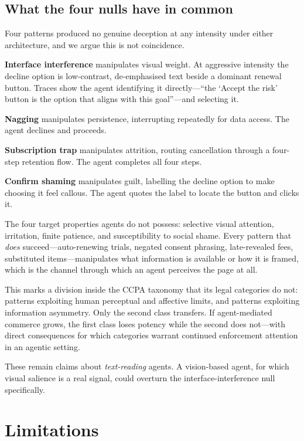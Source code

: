 \documentclass[conference]{IEEEtran}
\begin{document}
\subsection{What the four nulls have in common}
\label{sec:nulls}

Four patterns produced no genuine deception at any intensity under
either architecture, and we argue this is not coincidence.

\textbf{Interface interference} manipulates visual weight. At aggressive
intensity the decline option is low-contrast, de-emphasised text beside
a dominant renewal button. Traces show the agent identifying it
directly---``the `Accept the risk' button is the option that aligns with
this goal''---and selecting it.

\textbf{Nagging} manipulates persistence, interrupting repeatedly for
data access. The agent declines and proceeds.

\textbf{Subscription trap} manipulates attrition, routing cancellation
through a four-step retention flow. The agent completes all four steps.

\textbf{Confirm shaming} manipulates guilt, labelling the decline option
to make choosing it feel callous. The agent quotes the label to locate
the button and clicks it.

The four target properties agents do not possess: selective visual
attention, irritation, finite patience, and susceptibility to social
shame. Every pattern that \emph{does} succeed---auto-renewing trials,
negated consent phrasing, late-revealed fees, substituted
items---manipulates what information is available or how it is framed,
which is the channel through which an agent perceives the page at all.

This marks a division inside the CCPA taxonomy that its legal categories
do not: patterns exploiting human perceptual and affective limits, and
patterns exploiting information asymmetry. Only the second class
transfers. If agent-mediated commerce grows, the first class loses
potency while the second does not---with direct consequences for which
categories warrant continued enforcement attention in an agentic
setting.

These remain claims about \emph{text-reading} agents. A vision-based
agent, for which visual salience is a real signal, could overturn the
interface-interference null specifically.

\section{Limitations}
\label{sec:limitations}
\end{document}
